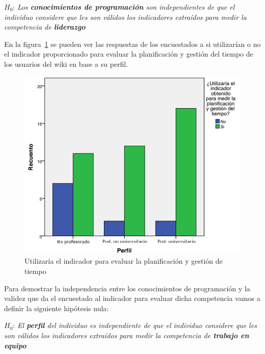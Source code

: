 \begin{mdframed}[style=hipotesis0]
$H_0$: \emph{Los \textbf{conocimientos de programación} son independientes de que el individuo considere que les son válidos los indicadores extraídos para medir la competencia de \textbf{liderazgo}}
\end{mdframed}

En la figura~\ref{fig:app:barras:perfil:planificacion} se pueden ver las respuestas de los encuestados a si utilizarían o no el indicador proporcionado para evaluar la planificación y gestión del tiempo de los usuarios del wiki en base a su perfil.

\begin{figure}
  \begin{center}
    \includegraphics[scale=0.3]{barras_perfil_planificacion.png}
  \end{center}
  \caption{Utilizaría el indicador para evaluar la planificación y gestión de tiempo}
  \label{fig:app:barras:perfil:planificacion}
\end{figure}

Para demostrar la independencia entre los conocimientos de programación y la validez que da el encuestado al indicador para evaluar dicha competencia vamos a definir la siguiente hipótesis nula:

\begin{mdframed}[style=hipotesis0]
$H_0$: \emph{El \textbf{perfil} del individuo es independiente de que el individuo considere que les son válidos los indicadores extraídos para medir la competencia de \textbf{trabajo en equipo}}
\end{mdframed}

